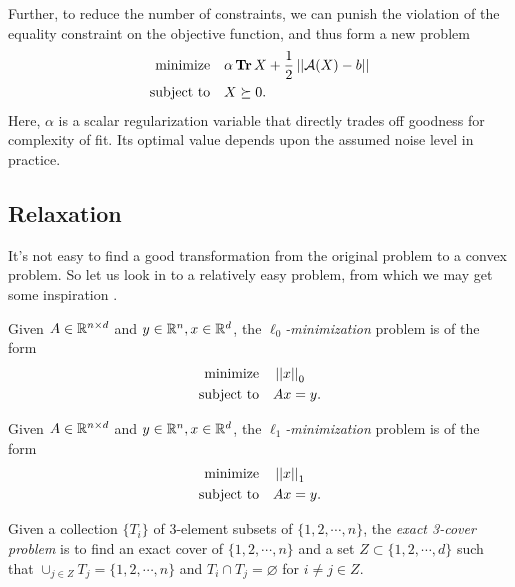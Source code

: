 \documentclass[11pt]{article}
\begin{document}
\begin{problem}
Further, to reduce the number of constraints, we can punish the violation of the equality constraint on the objective function, and thus form a new problem
\[\begin{aligned}
    \textnormal{minimize}\quad & \alpha\operatorname{\mathbf{Tr}} X+\frac12\left|\left|\mathcal A(X)-b\right|\right|\\
    \textnormal{subject to}\quad & X\succeq 0.
\end{aligned}\]
Here, \(\alpha\) is a scalar regularization variable that directly trades off goodness for complexity of fit. Its optimal value depends upon the assumed noise level in practice.

\subsection{Relaxation}

It's not easy to find a good transformation from the original problem to a convex problem. So let us look in to a relatively easy problem, from which we may get some inspiration \cite{horstmeyer2015solving}.

\begin{definition}
    Given \(A\in\mathbb R^{n\times d}\) and \(y\in\mathbb R^n,x\in\mathbb R^d\), the \emph{\(\ell_0\)-minimization} problem is of the form
    \[\begin{aligned}
        \textnormal{minimize}\quad & \left|\left|x\right|\right|_0\\
        \textnormal{subject to}\quad & Ax=y.
    \end{aligned}\]
\end{definition}

\begin{definition}
    Given \(A\in\mathbb R^{n\times d}\) and \(y\in\mathbb R^n,x\in\mathbb R^d\), the \emph{\(\ell_1\)-minimization} problem is of the form
    \[\begin{aligned}
        \textnormal{minimize}\quad & \left|\left|x\right|\right|_1\\
        \textnormal{subject to}\quad & Ax=y.
    \end{aligned}\]
\end{definition}

\begin{problem}\label{prb:exact-three-cover}
    Given a collection \(\{T_i\}\) of 3-element subsets of \(\{1,2,\cdots,n\}\), the \emph{exact 3-cover problem} is to find an exact cover of \(\{1,2,\cdots,n\}\) and a set \(Z \subset \{1,2,\cdots,d\}\) such that \(\cup_{j \in Z}T_j = \{1,2,\cdots,n\}\) and \(T_i \cap T_j = \varnothing\) for \(i\neq j\in Z\).
\end{problem}


\end{problem}
\end{document}
